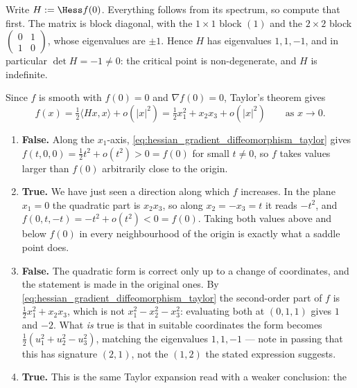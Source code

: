 \begin{exercisesolution}
\label{sol:hessian_gradient_diffeomorphism}
Write $H := \Hess f(0)$. Everything follows from its spectrum, so compute that first. The matrix is
block diagonal, with the $1\times1$ block $(1)$ and the $2\times2$ block
$\left(\begin{smallmatrix} 0 & 1 \\ 1 & 0\end{smallmatrix}\right)$, whose eigenvalues are $\pm 1$.
Hence $H$ has eigenvalues $1, 1, -1$, and in particular $\det H = -1 \neq 0$: the critical point is
non-degenerate, and $H$ is indefinite.

Since $f$ is smooth with $f(0) = 0$ and $\nabla f(0) = 0$, Taylor's theorem gives
\begin{equation}
\label{eq:hessian_gradient_diffeomorphism_taylor}
f(x) = \tfrac12 \langle Hx, x\rangle + o(\lvert x\rvert^2)
     = \tfrac12 x_1^2 + x_2x_3 + o(\lvert x\rvert^2)
     \qquad \text{as } x \to 0 .
\end{equation}
\begin{enumerate}[label=\textbf{(\alph*)}]
  \item \textbf{False.} Along the $x_1$-axis, \eqref{eq:hessian_gradient_diffeomorphism_taylor} gives
    $f(t,0,0) = \tfrac12 t^2 + o(t^2) > 0 = f(0)$ for small $t \neq 0$, so $f$ takes values larger
    than $f(0)$ arbitrarily close to the origin.
  \item \textbf{True.} We have just seen a direction along which $f$ increases. In the plane
    $x_1 = 0$ the quadratic part is $x_2x_3$, so along $x_2 = -x_3 = t$ it reads $-t^2$, and
    $f(0,t,-t) = -t^2 + o(t^2) < 0 = f(0)$. Taking both values above and below $f(0)$ in every
    neighbourhood of the origin is exactly what a saddle point does.
  \item \textbf{False.} The quadratic form is correct only up to a change of coordinates, and the
    statement is made in the original ones. By \eqref{eq:hessian_gradient_diffeomorphism_taylor} the second-order
    part of $f$ is $\tfrac12 x_1^2 + x_2 x_3$, which is not $x_1^2 - x_2^2 - x_3^2$: evaluating both
    at $(0,1,1)$ gives $1$ and $-2$. What \emph{is} true is that in suitable coordinates the form
    becomes $\tfrac12(u_1^2 + u_2^2 - u_3^2)$, matching the eigenvalues $1,1,-1$ --- note in
    passing that this has signature $(2,1)$, not the $(1,2)$ the stated expression suggests.
  \item \textbf{True.} This is the same Taylor expansion read with a weaker conclusion: the

\end{enumerate}
\end{exercisesolution}
